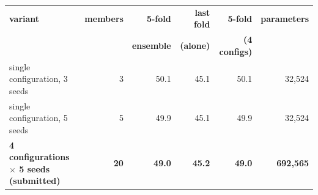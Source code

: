 \begin{tabular}{@{}p{3.2in}rrrrr@{}}
\toprule
\textbf{variant} & \textbf{members} & \textbf{5-fold} & \textbf{last fold} & \textbf{5-fold} & \textbf{parameters} \\
 & & \textbf{ensemble} & \textbf{(alone)} & \textbf{(4 configs)} & \\
\midrule
single configuration, 3 seeds & 3 & 50.1 & 45.1 & 50.1 & 32{,}524 \\
single configuration, 5 seeds & 5 & 49.9 & 45.1 & 49.9 & 32{,}524 \\
\textbf{4 configurations $\times$ 5 seeds (submitted)} & \textbf{20} & \textbf{49.0} & \textbf{45.2} & \textbf{49.0} & \textbf{692{,}565} \\
\bottomrule
\end{tabular}
